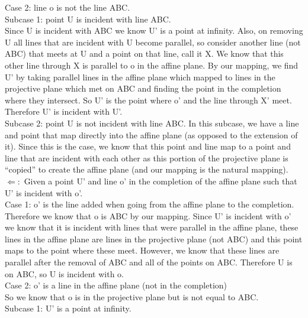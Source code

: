 \documentclass[12pt,letterpaper]{article}
\begin{document}
Case 2: line o is not the line ABC.\\

Subcase 1: point U is incident with line ABC. \\

Since U is incident with ABC we know U' is a point at infinity.  Also, on removing U all lines that are incident with U become parallel, so consider another line (not ABC) that meets at U and a point on that line, call it X.  We know that this other line through X is parallel to o in the affine plane.  By our mapping, we find U' by taking parallel lines in the affine plane which mapped to lines in the projective plane which met on ABC and finding the point in the completion where they intersect.  So U' is the point where o' and the line through X' meet.  Therefore U' is incident with U'.\\


Subcase 2: point U is not incident with line ABC.  In this subcase, we have a line and point that map directly into the affine plane (as opposed to the extension of it).  Since this is the case, we know that this point and line map to a point and line that are incident with each other as this portion of the projective plane is ``copied'' to create the affine plane (and our mapping is the natural mapping). \\


$\Leftarrow:$  Given a point U' and line o' in the completion of the affine plane such that U' is incident with o'.\\

Case 1:  o' is the line added when going from the affine plane to the completion.  Therefore we know that o is ABC by our mapping.  Since U' is incident with o' we know that it is incident with lines that were parallel in the affine plane, these lines in the affine plane are lines in the projective plane (not ABC) and this point maps to the point where these meet.  However, we know that these lines are parallel after the removal of ABC and all of the points on ABC.  Therefore U is on ABC, so U is incident with o.\\

Case 2: o' is a line in the affine plane (not in the completion)\\

So we know that o is in the projective plane but is not equal to ABC.  \\

Subcase 1: U' is a point at infinity.\\
\end{document}

